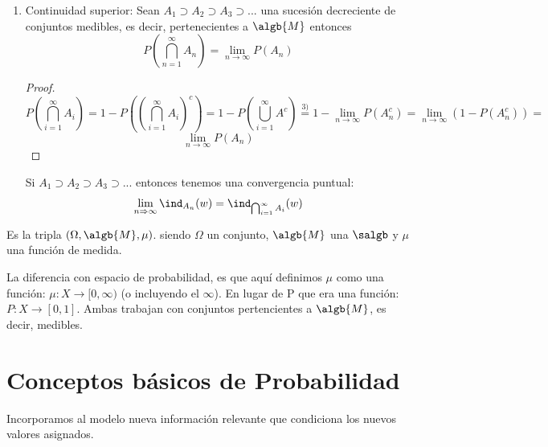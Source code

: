 \documentclass{apuntes}
\begin{document}
\begin{enumerate}
\begin{proof}
Entonces: 
\[P(\lim_{n \rightarrow \infty}A_n)=P(\bigcup_{n=1}^{\infty}A_n)=P(\bigcup_{n=1}^{\infty}D_n)=\sum_{n=1}^{\infty}P(D_n)=\lim_{n \rightarrow \infty}\sum_{i=1}^{n}P(D_i)=\lim_{n \rightarrow \infty}P(\bigcup_{i=1}^{n}D_i) =
\]
\[
=\lim_{n \rightarrow \infty}P(A_n)
\]
\end{proof} 

\obs De esta propiedad podemos afirmar lo siguiente: \[ \bigcup_{n=1}^{\infty}A_n = \lim_{n \rightarrow \infty} A_n \Rightarrow P(\lim_{n \rightarrow \infty} A_n) = \lim_{n \rightarrow \infty} P(A_n)
\]
\obs Si $A_1 \subset A_2 \subset A_3 \subset...$ entonces tenemos una convergencia puntual:
\[
\lim_{n \Rightarrow \infty}\ind_{A_n}(w) = \ind_{\bigcup_{i=1}^{\infty}A_i}(w)
\]

\item Continuidad superior: Sean $A_1 \supset A_2 \supset A_3 \supset ...$ una sucesión decreciente de conjuntos medibles, es decir, pertenecientes a $\algb{M}$ entonces 
\[ P(\bigcap_{n=1}^{\infty}A_n) = \lim_{n \rightarrow \infty} P(A_n)
\]

\begin{proof}
\[P(\bigcap_{i=1}^{\infty}A_i) = 1-P\left((\bigcap_{i=1}^{\infty}A_i)^c\right)=1-P(\bigcup_{i=1}^{\infty}A^c) \stackrel{3)}{=} 1-\lim_{n \rightarrow \infty}P(A_n^c)=\lim_{n \rightarrow \infty}(1-P(A_n^c)) = 
\]
\[
\lim_{n \rightarrow \infty}P(A_n)
\]
\end{proof}

\obs Si $A_1 \supset A_2 \supset A_3 \supset...$ entonces tenemos una convergencia puntual:
\[
\lim_{n \Rightarrow \infty}\ind_{A_n}(w) = \ind_{\bigcap_{i=1}^{\infty}A_i}(w)
\]
\end{enumerate}


\begin{defn}
 Es la tripla $(\Omega, \algb{M}, \mu)$. siendo $\Omega$ un conjunto, $\algb{M}$ una $\salgb$ y $\mu$ una función de medida.
\end{defn}

La diferencia con espacio de probabilidad, es que aquí definimos $\mu$ como una función: $\mu: X \rightarrow [0,\infty)$  (o incluyendo el $\infty$). En lugar de P que era una función: $P: X \rightarrow [0,1]$. Ambas trabajan con conjuntos pertencientes a $\algb{M}$, es decir, medibles.


\section{Conceptos básicos de Probabilidad}
Incorporamos al modelo nueva información relevante que condiciona los nuevos valores asignados.
\end{document}
